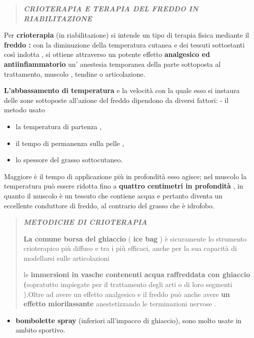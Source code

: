 \documentclass[]{article}
\date{}
\begin{document}
\begin{quote}
\textbf{\emph{CRIOTERAPIA E TERAPIA DEL FREDDO IN RIABILITAZIONE}}
\end{quote}

Per \textbf{crioterapia} (in riabilitazione) si intende un tipo di
terapia fisica mediante il \textbf{freddo :} con la diminuzione della
temperatura cutanea e dei tessuti sottostanti così indotta , si ottiene
attraverso un potente effetto \textbf{analgesico ed antiinfiammatorio}
un' anestesia temporanea della parte sottoposta al trattamento, muscolo
, tendine o articolazione.

\textbf{L'abbassamento di temperatura} e la velocità con la quale esso
si instaura delle zone sottoposte all'azione del freddo dipendono da
diversi fattori: - il metodo usato

\begin{itemize}
\item
  la temperatura di partenza ,
\item
  il tempo di permanenza sulla pelle ,
\item
  lo spessore del grasso sottocutaneo.
\end{itemize}

Maggiore è il tempo di applicazione più in profondità esso agisce; nel
muscolo la temperatura può essere ridotta fino a \textbf{quattro
centimetri in profondità} , in quanto il muscolo è un tessuto che
contiene acqua e pertanto diventa un eccellente conduttore di freddo, al
contrario del grasso che è idrofobo.

\begin{quote}
\textbf{\emph{METODICHE DI CRIOTERAPIA}}

\textbf{La comune borsa del ghiaccio} ( \textbf{ice bag} ) è sicuramente
lo strumento crioterapico più diffuso e tra i più efficaci, anche per la
sua capacità di modellarsi sulle articolazioni

le \textbf{immersioni in vasche contenenti acqua raffreddata con
ghiaccio (}sopratutto impiegate per il trattamento degli arti o di loro
segmenti ).Oltre ad avere un effetto analgesico e il freddo può anche
avere \textbf{un effetto miorilassante} anestetizzando le terminazioni
nervose .
\end{quote}

\begin{itemize}
\item
  \textbf{bombolette spray} (inferiori all'impacco di ghiaccio), sono
  molto usate in ambito sportivo.
\end{itemize}
\end{document}
